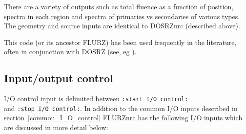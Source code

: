\documentclass[12pt,twoside]{article}  %
\begin{document}
There are a variety of outputs such as total fluence as a function of
position, spectra in each region and spectra of primaries vs secondaries of
various types.  The geometry and source inputs are identical to DOSRZnrc 
(described above).

This code (or its ancestor FLURZ) has been used frequently in the
literature, often in conjunction with DOSRZ (see, eg \cite{Ma91}).  

\subsection{Input/output control}
 
I/O control input is delimited between \verb+:start I/O control:+\\
and \verb+:stop I/O control:+.  In addition to the common
I/O inputs described in section~\ref{common_I_O_control} FLURZnrc has the
following I/O inputs which are discussed in more detail below:
\end{document}
